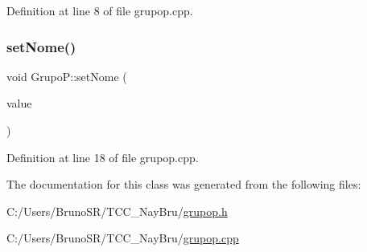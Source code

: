 Definition at line 8 of file grupop.\+cpp.

\hypertarget{class_grupo_p_af747750583e09cf0a1cfe756bacf97bc}{}\label{class_grupo_p_af747750583e09cf0a1cfe756bacf97bc} 
\subsubsection{\texorpdfstring{set\+Nome()}{setNome()}}
{\footnotesize\ttfamily void Grupo\+P\+::set\+Nome (\begin{DoxyParamCaption}\item[{const Q\+String \&}]{value }\end{DoxyParamCaption})}



Definition at line 18 of file grupop.\+cpp.



The documentation for this class was generated from the following files\+:\begin{DoxyCompactItemize}
\item 
C\+:/\+Users/\+Bruno\+S\+R/\+T\+C\+C\+\_\+\+Nay\+Bru/\hyperlink{grupop_8h}{grupop.\+h}\item 
C\+:/\+Users/\+Bruno\+S\+R/\+T\+C\+C\+\_\+\+Nay\+Bru/\hyperlink{grupop_8cpp}{grupop.\+cpp}\end{DoxyCompactItemize}
